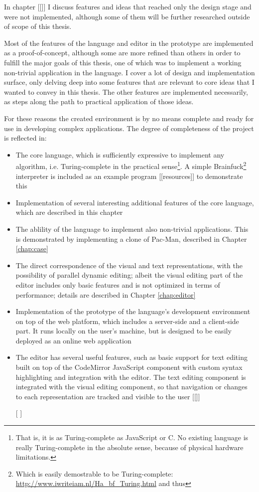 In chapter [[]] I discuss features and ideas that reached only the design stage and were not implemented, although some of them will be further researched outside of scope of this thesis.

Most of the features of the language and editor in the prototype are implemented as a proof-of-concept, although some are more refined than others in order to fulfill the major goals of this thesis, one of which was to implement a working non-trivial application in the language. I cover a lot of design and implementation surface, only delving deep into some features that are relevant to core ideas that I wanted to convey in this thesis. The other features are implemented necessarily, as steps along the path to practical application of those ideas.

For these reasons the created environment is by no means complete and ready for use in developing complex applications. The degree of completeness of the project is reflected in:
\begin{itemize}
    \item The core language, which is sufficiently expressive to implement any algorithm, i.e. Turing-complete in the practical sense\footnote{That is, it is as Turing-complete as JavaScript or C. No existing language is really Turing-complete in the absolute sense, because of physical hardware limitations.}. A simple Brainfuck\footnote{Which is easily demostrable to be Turing-complete: \url{http://www.iwriteiam.nl/Ha_bf_Turing.html} and thus} interpreter is included as an example program [[resources]] to demonstrate this
    \item Implementation of several interesting additional features of the core language, which are described in this chapter
    \item The ablility of the language to implement also non-trivial applications. This is demonstrated by implementing a clone of Pac-Man, described in Chapter \ref{chap:case}
    \item The direct correspondence of the visual and text representations, with the possibility of parallel dynamic editing; albeit the visual editing part of the editor includes only basic features and is not optimized in terms of performance; details are described in Chapter \ref{chap:editor}
    \item Implementation of the prototype of the language's development environment on top of the web platform, which includes a server-side and a client-side part. It runs locally on the user's machine, but is designed to be easily deployed as an online web application
    \item The editor has several useful features, such as basic support for text editing built on top of the CodeMirror JavaScript component with custom syntax highlighting and integration with the editor. The text editing component is integrated with the visual editing component, so that navigation or changes to each representation are tracked and visible to the user [[]]
    \item [[]]
\end{itemize}

